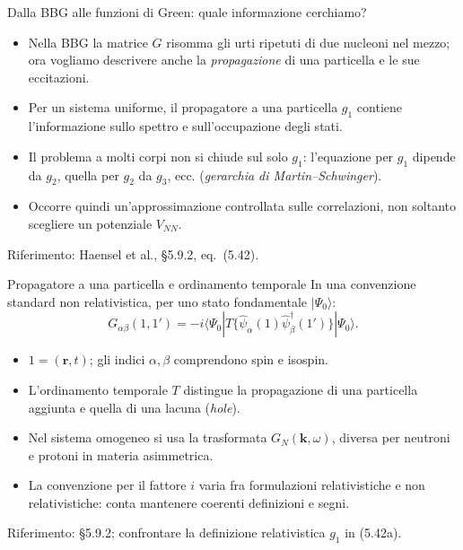 \begin{frame}[t]{Dalla BBG alle funzioni di Green: quale informazione cerchiamo?}
\small
\begin{itemize}
\item Nella BBG la matrice $G$ risomma gli urti ripetuti di due nucleoni nel mezzo; ora vogliamo descrivere anche la \emph{propagazione} di una particella e le sue eccitazioni.
\item Per un sistema uniforme, il propagatore a una particella $g_1$ contiene l'informazione sullo spettro e sull'occupazione degli stati.
\item Il problema a molti corpi non si chiude sul solo $g_1$: l'equazione per $g_1$ dipende da $g_2$, quella per $g_2$ da $g_3$, ecc. (\emph{gerarchia di Martin--Schwinger}).
\item Occorre quindi un'approssimazione controllata sulle correlazioni, non soltanto scegliere un potenziale $V_{NN}$.
\end{itemize}
\medskip
{\footnotesize Riferimento: Haensel et al., §5.9.2, eq.~(5.42).}
\end{frame}

\begin{frame}[t]{Propagatore a una particella e ordinamento temporale}
\small
In una convenzione standard non relativistica, per uno stato fondamentale $|\Psi_0\rangle$:
\[
G_{\alpha\beta}(1,1')=-i
\langle\Psi_0|T\{\hat\psi_\alpha(1)\hat\psi_\beta^\dagger(1')\}|\Psi_0\rangle.
\]
\begin{itemize}
\item $1=(\mathbf r,t)$; gli indici $\alpha,\beta$ comprendono spin e isospin.
\item L'ordinamento temporale $T$ distingue la propagazione di una particella aggiunta e quella di una lacuna (\emph{hole}).
\item Nel sistema omogeneo si usa la trasformata $G_N(\mathbf k,\omega)$, diversa per neutroni e protoni in materia asimmetrica.
\item La convenzione per il fattore $i$ varia fra formulazioni relativistiche e non relativistiche: conta mantenere coerenti definizioni e segni.
\end{itemize}
{\footnotesize Riferimento: §5.9.2; confrontare la definizione relativistica $g_1$ in (5.42a).}
\end{frame}

